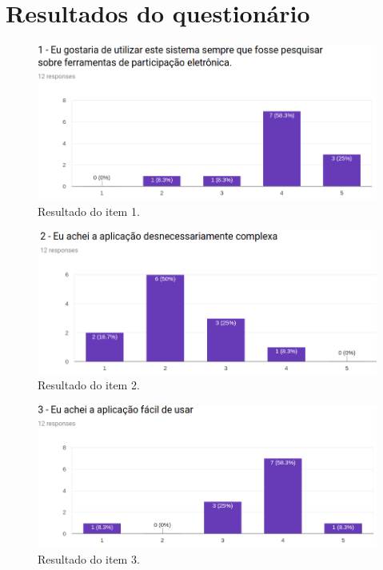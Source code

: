 \chapter{Resultados do questionário}
\label{apendice:a}

\begin{figure}[!ht]
    \centering
    \includegraphics[scale=0.5]{./figuras/q1.png}
    \caption{Resultado do item 1.}
    \label{fig:q1}
\end{figure}

\begin{figure}[!ht]
    \centering
    \includegraphics[scale=0.5]{./figuras/q2.png}
    \caption{Resultado do item 2.}
    \label{fig:q2}
\end{figure}

\begin{figure}[!ht]
    \centering
    \includegraphics[scale=0.5]{./figuras/q3.png}
    \caption{Resultado do item 3.}
    \label{fig:q3}
\end{figure}

